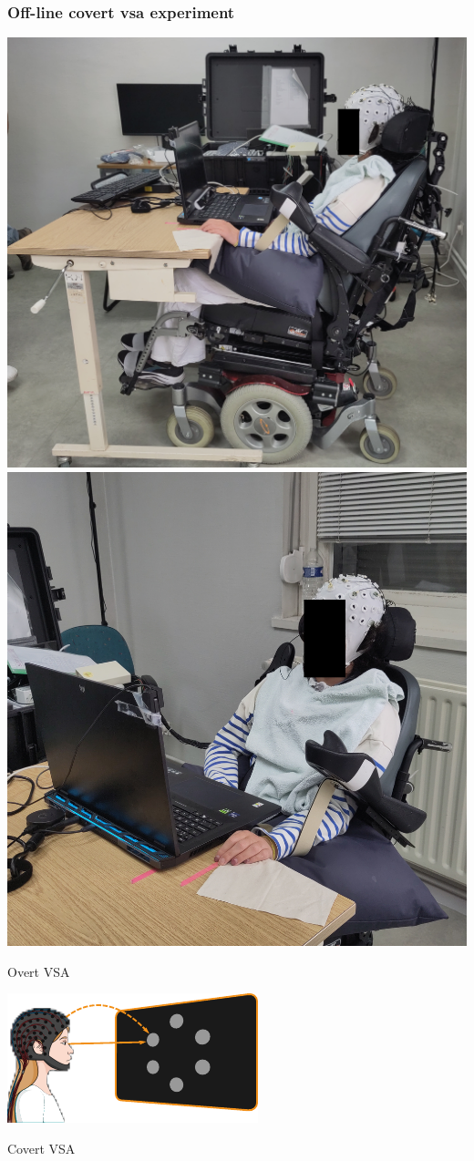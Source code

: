 \documentclass{kul-ulille-beamer}
\begin{document}
\begin{frame}
  \frametitle{Off-line covert vsa experiment}

  \begin{minipage}{.6\textwidth}
    \includegraphics[height=.45\textwidth]{figures/patients/PD01a-obfuscated.jpg}%
    \hfill%
    \includegraphics[height=.45\textwidth]{figures/patients/PD01b-obfuscated.jpg}%
    \bigskip

    {\small
    \begin{minipage}{.3\textwidth}
      Overt VSA
      \smallskip

      \includegraphics[width=\textwidth]{figures/covert/attention_overt.pdf}
    \end{minipage}\hfill%
    \begin{minipage}{.3\textwidth}
      Covert VSA
      \smallskip


\end{minipage}}
\end{minipage}
\end{frame}
\end{document}
